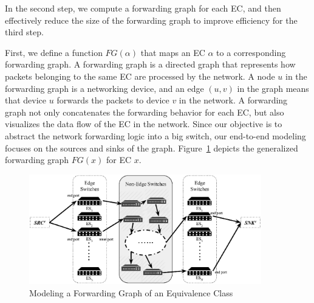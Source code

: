 \label{OBS:Sec:GenerateFG}
In the second step, we compute a forwarding graph for each EC, and then effectively reduce the size of the forwarding graph to improve efficiency for the third step.

First, we define a function $FG(\alpha)$ that maps an EC $\alpha$ to a corresponding forwarding graph. A forwarding graph is a directed graph that represents how packets belonging to the same EC are processed by the network. A node $u$ in the forwarding graph is a networking device, and an edge $(u, v)$ in the graph means that device $u$ forwards the packets to device $v$ in the network.
A forwarding graph not only concatenates the forwarding behavior for each EC, but also visualizes the data flow of the EC in the network.
Since our objective is to abstract the network forwarding logic into a big switch, our end-to-end modeling focuses on the sources and sinks of the graph.
Figure~\ref{OBS:Fig:ForwardingGraphECX} depicts the generalized forwarding graph $FG(x)$ for EC $x$.


\begin{figure}
    \centering
    \includegraphics[width=0.9\textwidth]{OneBigSwitch/figures/ForwardingGraph.eps}
    \caption{Modeling a Forwarding Graph of an Equivalence Class}
    \label{OBS:Fig:ForwardingGraphECX}
\end{figure}

